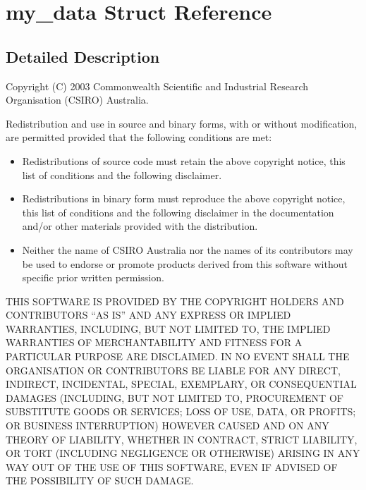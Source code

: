 \section{my\_\-data Struct Reference}
\label{structmy__data}


\subsection{Detailed Description}
Copyright (C) 2003 Commonwealth Scientific and Industrial Research Organisation (CSIRO) Australia. 

Redistribution and use in source and binary forms, with or without modification, are permitted provided that the following conditions are met:

\begin{itemize}
\item Redistributions of source code must retain the above copyright notice, this list of conditions and the following disclaimer.\end{itemize}


\begin{itemize}
\item Redistributions in binary form must reproduce the above copyright notice, this list of conditions and the following disclaimer in the documentation and/or other materials provided with the distribution.\end{itemize}


\begin{itemize}
\item Neither the name of CSIRO Australia nor the names of its contributors may be used to endorse or promote products derived from this software without specific prior written permission.\end{itemize}


THIS SOFTWARE IS PROVIDED BY THE COPYRIGHT HOLDERS AND CONTRIBUTORS ``AS IS'' AND ANY EXPRESS OR IMPLIED WARRANTIES, INCLUDING, BUT NOT LIMITED TO, THE IMPLIED WARRANTIES OF MERCHANTABILITY AND FITNESS FOR A PARTICULAR PURPOSE ARE DISCLAIMED. IN NO EVENT SHALL THE ORGANISATION OR CONTRIBUTORS BE LIABLE FOR ANY DIRECT, INDIRECT, INCIDENTAL, SPECIAL, EXEMPLARY, OR CONSEQUENTIAL DAMAGES (INCLUDING, BUT NOT LIMITED TO, PROCUREMENT OF SUBSTITUTE GOODS OR SERVICES; LOSS OF USE, DATA, OR PROFITS; OR BUSINESS INTERRUPTION) HOWEVER CAUSED AND ON ANY THEORY OF LIABILITY, WHETHER IN CONTRACT, STRICT LIABILITY, OR TORT (INCLUDING NEGLIGENCE OR OTHERWISE) ARISING IN ANY WAY OUT OF THE USE OF THIS SOFTWARE, EVEN IF ADVISED OF THE POSSIBILITY OF SUCH DAMAGE. 


